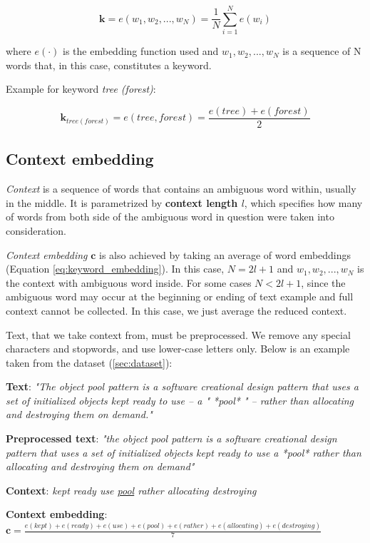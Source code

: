 \documentclass{llncs}
\begin{document}
\begin{equation}
    \label{eq:keyword_embedding}
    \bm{k} = e(w_1, w_2, ..., w_N) = \frac{1}{N}\sum_{i=1}^{N} e(w_i)
\end{equation}

where \(e(\cdot)\) is the embedding function used and \(w_1, w_2, ..., w_N\) is a sequence of N words that, in this case, constitutes a keyword.

Example for keyword \textit{tree (forest)}:

\begin{equation}
    \label{eq:example_kw_embed}
    \bm{k}_{tree (forest)} = e(tree, forest) = \frac{e(tree) + e(forest)}{2}
\end{equation}

\subsection{Context embedding}
\label{sec:ctx_embed}
\textit{Context} is a sequence of words that contains an ambiguous word within, usually in the middle.
It is parametrized by \textbf{context length \(l\)}, which specifies how many of words from both side of the ambiguous word in question were taken into consideration.

\textit{Context embedding} \(\bm{c}\) is also achieved by taking an average of word embeddings (Equation \ref{eq:keyword_embedding}).
In this case, \(N = 2l + 1\) and \(w_1, w_2, ..., w_N\) is the context with ambiguous word inside. For some cases \(N < 2l + 1\), since the ambiguous word may occur at the beginning or ending of text example and full context cannot be collected.
In this case, we just average the reduced context.

Text, that we take context from, must be preprocessed.
We remove any special characters and stopwords, and use lower-case letters only. Below is an example taken from the dataset (\ref{sec:dataset}):

\begin{tcolorbox}[
    colframe=blue!25,
    colback=white!10,
    coltitle=white!20!black,
    title={Example for keyword \textit{pool (computer science)} with context length \(l=3\)}]

\textbf{Text}:
\textit{"The object pool pattern is a software creational design pattern that uses a set of initialized objects kept ready to use – a " *pool* " – rather than allocating and destroying them on demand."}

\textbf{Preprocessed text}:
\textit{"the object pool pattern is a software creational design pattern that uses a set of initialized objects kept ready to use a *pool* rather than allocating and destroying them on demand"}

\textbf{Context}:
\textit{kept ready use \underline{pool} rather allocating destroying}

\textbf{Context embedding}:
\(\bm{c} = \frac{e(kept) + e(ready) + e(use) + e(pool) + e(rather) + e(allocating) + e(destroying)}{7}\)

\end{tcolorbox}
\end{document}
